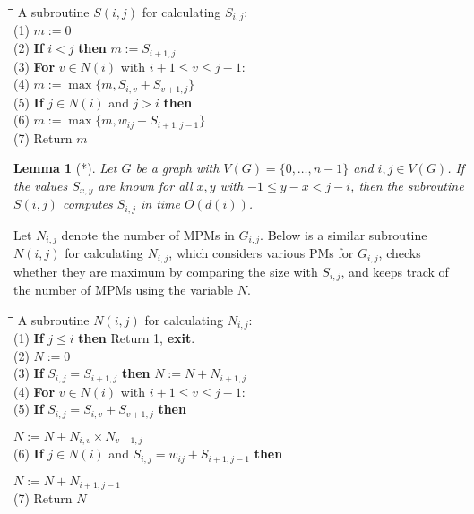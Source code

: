 \documentclass{llncs}
\def\notat#1{{$#1$}\marginpar{\raggedright{\small $#1$}}}
\newtheorem{lem}[thm]{Lemma}
\begin{document}
\begin{tabbing}
\qquad \=\quad \=\quad \= \quad \kill
A subroutine $S(i,j)$ for calculating $S_{i,j}$:\\


(1) \> $m:=0$\\

(2) \> {\bf If} $i<j$ {\bf then} $m:=S_{i+1,j}$\\

(3) \> {\bf For} $v\in N(i)$ with $i+1\leq v\leq j-1$:\\

(4) \> \> $m:=\max\{m,S_{i,v}+S_{v+1,j}\}$\\

(5) \> {\bf If} $j\in N(i)$ and $j>i$ {\bf then}\\

(6) \> \> $m:=\max\{m,w_{ij}+S_{i+1,j-1}\}$\\

(7) \> Return $m$

\end{tabbing}


\begin{lem}[*]
\label{lem:Sroutine}
Let $G$ be a graph with $V(G)=\{0,\ldots,n-1\}$ and $i,j\in V(G)$.
If the values $S_{x,y}$ are known for all $x,y$ with $-1\leq y-x<j-i$, then the subroutine $S(i,j)$ computes $S_{i,j}$ in time $O(d(i))$.
\end{lem}



Let \notat{N_{i,j}} denote the number of MPMs in $G_{i,j}$. 
Below is a similar subroutine $N(i,j)$ for calculating $N_{i,j}$, which considers various PMs for $G_{i,j}$, checks whether they are maximum by comparing the size with $S_{i,j}$, and keeps track of the number of MPMs using the variable $N$.


\begin{tabbing}
\qquad \=\quad \=\quad \= \quad \kill
A subroutine $N(i,j)$ for calculating $N_{i,j}$:\\

(1) \> {\bf If} $j\leq i$ {\bf then} Return 1, {\bf exit}.\\

(2) \> $N:=0$\\

(3) \> {\bf If} $S_{i,j}=S_{i+1,j}$ {\bf then} $N:=N+N_{i+1,j}$\\

(4) \> {\bf For} $v\in N(i)$ with $i+1\leq v\leq j-1$:\\

(5) \> \> {\bf If} $S_{i,j}=S_{i,v}+S_{v+1,j}$ {\bf then}

		$N:=N + N_{i,v}\times N_{v+1,j}$\\

(6) \> {\bf If} $j\in N(i)$ and $S_{i,j}=w_{ij}+S_{i+1,j-1}$ {\bf then}

 $N:=N + N_{i+1,j-1}$\\

(7) \> Return $N$

\end{tabbing}
\end{document}

